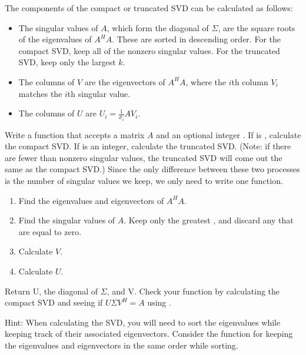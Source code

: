 The components of the compact or truncated SVD can be calculated as follows:
\begin{itemize}
\item The singular values of $A$, which form the diagonal of $\Sigma$, are the square roots of the eigenvalues of $A^HA$. 
These are sorted in descending order. 
For the compact SVD, keep all of the nonzero singular values. 
For the truncated SVD, keep only the largest $k$.
\item The columns of $V$ are the eigenvectors of $A^HA$, where the $i$th column $V_i$ matches the $i$th singular value.
\item The columns of $U$ are $U_i = \frac{1}{\sigma_i} AV_i$.
\end{itemize}

\begin{problem}
Write a function  that accepts a matrix $A$ and an optional integer . 
If  is , calculate the compact SVD. If  is an integer, calculate the truncated SVD.
(Note: if there are fewer than  nonzero singular values, the truncated SVD will come out the same as the compact SVD.)
Since the only difference between these two processes is the number of singular values we keep, we only need to write one function.

\begin{enumerate}
\item Find the eigenvalues and eigenvectors of $A^H A$.
\item Find the singular values of $A$. Keep only the greatest , and discard any that are equal to zero.
\item Calculate $V$.
\item Calculate $U$.
\end{enumerate}

Return U, the diagonal of $\Sigma$, and V.
Check your function by calculating the compact SVD and seeing if $U\Sigma V^H = A$ using .

Hint: When calculating the SVD, you will need to sort the eigenvalues while keeping track of their associated eigenvectors. 
Consider the function  for keeping the eigenvalues and eigenvectors in the same order while sorting.
\label{prob:calc_svd}
\end{problem}

